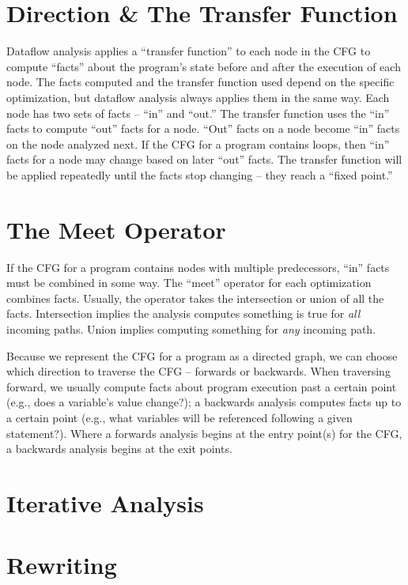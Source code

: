 \documentclass[12pt]{report}
\begin{document}
\section{Direction \& The Transfer Function}

Dataflow analysis applies a ``transfer function'' to each node in the
CFG to compute ``facts'' about the program's state before and after
the execution of each node. The facts computed and the transfer
function used depend on the specific optimization, but dataflow
analysis always applies them in the same way. Each node has two sets
of facts -- ``in'' and ``out.'' The transfer function uses the ``in''
facts to compute ``out'' facts for a node. ``Out'' facts on a node
become ``in'' facts on the node analyzed next.  If the CFG for a
program contains loops, then ``in'' facts for a node may change based
on later ``out'' facts. The transfer function will be applied
repeatedly until the facts stop changing -- they reach a ``fixed
point.''

\section{The Meet Operator}
If the CFG for a program contains nodes with multiple predecessors,
``in'' facts must be combined in some way. The ``meet'' operator for
each optimization combines facts. Usually, the operator takes the
intersection or union of all the facts. Intersection implies the
analysis computes something is true for \emph{all} incoming paths. Union
implies computing something for \emph{any} incoming path.

Because we represent the CFG for a program as a directed graph, we can
choose which direction to traverse the CFG -- forwards or backwards.
When traversing forward, we usually compute facts about program
execution past a certain point (e.g., does a variable's value
change?); a backwards analysis computes facts up to a certain point
(e.g., what variables will be referenced following a given
statement?). Where a forwards analysis begins at the entry point(s)
for the CFG, a backwards analysis begins at the exit points.

\section{Iterative Analysis}

\section{Rewriting}
\end{document}
